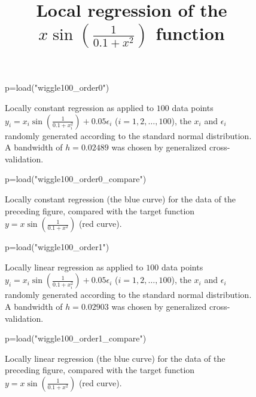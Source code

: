 \documentclass[11pt, reqno]{amsart}
\begin{document}
 
\title{Local regression of the $x\sin\left(\frac{1}{0.1+x^2}\right)$ function}

\maketitle

\begin{figure}
  \begin{sagesilent}
     p=load("wiggle100_order0")
  \end{sagesilent}
  \centering 
  \caption{Locally constant regression as applied to $100$ data points
    $y_i= x_i\sin\left(\frac{1}{0.1+x_i^2}\right) + 0.05\epsilon_i$
    ($i=1,2,\ldots,100$), the $x_i$ and $\epsilon_i$ randomly
    generated according to the standard normal distribution. A
    bandwidth of $h=0.02489$ was chosen by generalized
    cross-validation.}
\end{figure}


\begin{figure}
  \begin{sagesilent}
     p=load("wiggle100_order0_compare")
  \end{sagesilent}
  \centering 
  \caption{Locally constant regression (the blue curve) for the data of
    the preceding figure, compared with the target function
    $y=x\sin\left(\frac{1}{0.1+x^2}\right)$ (red curve).}
\end{figure}

\newpage

\begin{figure}
  \begin{sagesilent}
     p=load("wiggle100_order1")
  \end{sagesilent}
  \centering 
  \caption{Locally linear regression as applied to $100$ data points
    $y_i= x_i\sin\left(\frac{1}{0.1+x_i^2}\right) + 0.05\epsilon_i$
    ($i=1,2,\ldots,100$), the $x_i$ and $\epsilon_i$ randomly
    generated according to the standard normal distribution. A
    bandwidth of $h=0.02903$ was chosen by generalized
    cross-validation.}
\end{figure}


\begin{figure}
  \begin{sagesilent}
     p=load("wiggle100_order1_compare")
  \end{sagesilent}
  \centering 
  \caption{Locally linear regression (the blue curve) for the data of
    the preceding figure, compared with the target function
    $y=x\sin\left(\frac{1}{0.1+x^2}\right)$ (red curve).}
\end{figure}
\end{document}
